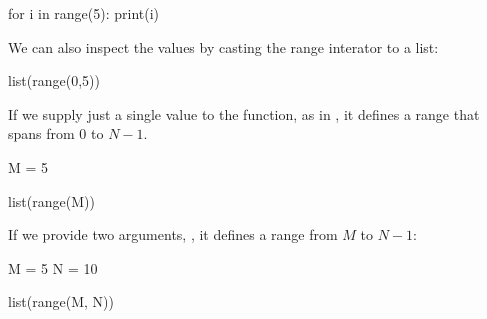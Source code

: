 \documentclass[letterpaper,10pt,english]{sphinxmanual}
\begin{document}
{
\begin{sphinxVerbatim}[commandchars=\\\{\}]
\llap{\color{nbsphinxin}[ ]:\,\hspace{\fboxrule}\hspace{\fboxsep}}for i in range(5):
    print(i)
\end{sphinxVerbatim}
}

We can also inspect the values by casting the range interator to a list:

{
\begin{sphinxVerbatim}[commandchars=\\\{\}]
\llap{\color{nbsphinxin}[ ]:\,\hspace{\fboxrule}\hspace{\fboxsep}}list(range(0,5))
\end{sphinxVerbatim}
}

If we supply just a single value to the  function, as in , it defines a range that spans from \(0\) to \(N-1\).

{
\begin{sphinxVerbatim}[commandchars=\\\{\}]
\llap{\color{nbsphinxin}[ ]:\,\hspace{\fboxrule}\hspace{\fboxsep}}M = 5

list(range(M))
\end{sphinxVerbatim}
}

If we provide two arguments, , it defines a range from \(M\) to \(N-1\):

{
\begin{sphinxVerbatim}[commandchars=\\\{\}]
\llap{\color{nbsphinxin}[ ]:\,\hspace{\fboxrule}\hspace{\fboxsep}}M = 5
N = 10

list(range(M, N))
\end{sphinxVerbatim}
}
\end{document}
